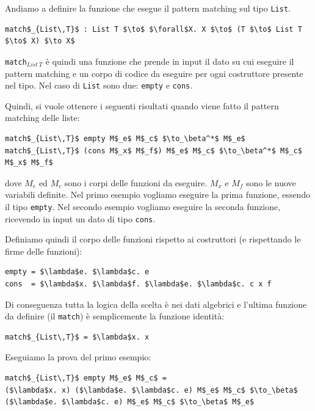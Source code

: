 \documentclass{article}
\begin{document}
\bigskip

Andiamo a definire la funzione che esegue il pattern matching sul tipo \verb|List|.
\begin{lstlisting}[mathescape=true]
match$_{List\,T}$ : List T $\to$ $\forall$X. X $\to$ (T $\to$ List T $\to$ X) $\to X$
\end{lstlisting}
\verb|match|$_{List\,T}$ è quindi una funzione che prende in input il dato su cui eseguire il pattern matching e un corpo di codice da eseguire per ogni costruttore presente nel tipo. Nel caso di \verb|List| sono due: \verb|empty| e \verb|cons|.

\bigskip

Quindi, si vuole ottenere i seguenti risultati quando viene fatto il pattern matching delle liste:
\begin{lstlisting}[mathescape=true]
match$_{List\,T}$ empty M$_e$ M$_c$ $\to_\beta^*$ M$_e$
match$_{List\,T}$ (cons M$_x$ M$_f$) M$_e$ M$_c$ $\to_\beta^*$ M$_c$ M$_x$ M$_f$
\end{lstlisting}
dove $M_e$ ed $M_c$ sono i corpi delle funzioni da eseguire. $M_x$ e $M_f$ sono le nuove variabili definite. Nel primo esempio vogliamo eseguire la prima funzione, essendo il tipo \verb|empty|. Nel secondo esempio vogliamo eseguire la seconda funzione, ricevendo in input un dato di tipo \verb|cons|.

\bigskip

Definiamo quindi il corpo delle funzioni rispetto ai costruttori (e rispettando le firme delle funzioni):
\begin{lstlisting}[mathescape=true]
empty = $\lambda$e. $\lambda$c. e
cons  = $\lambda$x. $\lambda$f. $\lambda$e. $\lambda$c. c x f
\end{lstlisting}
Di conseguenza tutta la logica della scelta è nei dati algebrici e l'ultima funzione da definire (il \verb|match|) è semplicemente la funzione identità:
\begin{lstlisting}[mathescape=true]
match$_{List\,T}$ = $\lambda$x. x
\end{lstlisting}

\bigskip

Eseguiamo la prova del primo esempio:
\begin{lstlisting}[mathescape=true]
match$_{List\,T}$ empty M$_e$ M$_c$ =
($\lambda$x. x) ($\lambda$e. $\lambda$c. e) M$_e$ M$_c$ $\to_\beta$
($\lambda$e. $\lambda$c. e) M$_e$ M$_c$ $\to_\beta$ M$_e$
\end{lstlisting}

\bigskip
\end{document}

